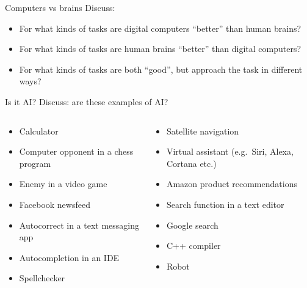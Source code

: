 \begin{frame}{Computers vs brains}
	Discuss:
	\begin{itemize}
		\pause\item For what kinds of tasks are digital computers ``better'' than human brains?
		\pause\item For what kinds of tasks are human brains ``better'' than digital computers?
		\pause\item For what kinds of tasks are both ``good'', but approach the task in different ways?
	\end{itemize}
\end{frame}

\begin{frame}{Is it AI?}
	Discuss: are these examples of AI?
	\begin{columns}
		\begin{column}{0.48\textwidth}
			\begin{itemize}
				\pause\item Calculator
				\pause\item Computer opponent in a chess program
				\pause\item Enemy in a video game
				\pause\item Facebook newsfeed
				\pause\item Autocorrect in a text messaging app
				\pause\item Autocompletion in an IDE
				\pause\item Spellchecker
			\end{itemize}
		\end{column}
		\begin{column}{0.48\textwidth}
			\begin{itemize}
				\pause\item Satellite navigation
				\pause\item Virtual assistant (e.g.\ Siri, Alexa, Cortana etc.)
				\pause\item Amazon product recommendations
				\pause\item Search function in a text editor
				\pause\item Google search
				\pause\item C++ compiler
				\pause\item Robot
			\end{itemize}
		\end{column}
	\end{columns}
\end{frame}

